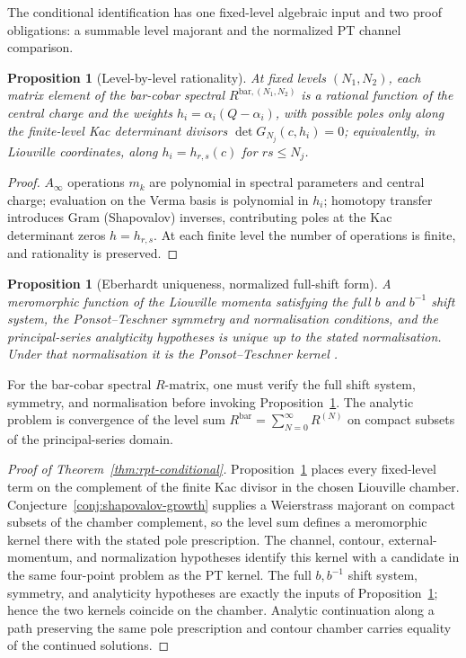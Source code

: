\documentclass[11pt]{amsart}
\newtheorem{proposition}[theorem]{Proposition}
\theoremstyle{definition}
\theoremstyle{remark}
\providecommand{\Ainf}{A_\infty}
\begin{document}
The conditional identification has one fixed-level algebraic input and
two proof obligations: a summable level majorant and the normalized PT
channel comparison.

\begin{proposition}[Level-by-level rationality]
\label{prop:rpt-level-rationality}
At fixed levels $(N_1, N_2)$, each matrix element of the bar-cobar
spectral $R^{\mathrm{bar},(N_1,N_2)}$ is a rational function of
the central charge and the weights
$h_i = \alpha_i(Q - \alpha_i)$, with possible poles only along the
finite-level Kac determinant divisors
$\det G_{N_j}(c,h_i)=0$; equivalently, in Liouville coordinates,
along $h_i=h_{r,s}(c)$ for $rs\leq N_j$.
\end{proposition}

\begin{proof}
$\Ainf$ operations $m_k$ are polynomial in spectral parameters and
central charge; evaluation on the Verma basis is polynomial in $h_i$;
homotopy transfer introduces Gram (Shapovalov) inverses, contributing
poles at the Kac determinant zeros $h = h_{r,s}$. At each finite
level the number of operations is finite, and rationality is
preserved.
\end{proof}

\begin{proposition}[Eberhardt uniqueness, normalized full-shift form]
\label{prop:eberhardt-uniqueness}
A meromorphic function of the Liouville momenta satisfying the full
$b$ and $b^{-1}$ shift system, the Ponsot--Teschner symmetry and
normalisation conditions, and the principal-series analyticity
hypotheses is unique up to the stated normalisation.  Under that
normalisation it is the Ponsot--Teschner kernel
\cite[Theorem~1.1]{Eberhardt23}.
\end{proposition}

For the bar-cobar spectral $R$-matrix, one must verify the full
shift system, symmetry, and normalisation before invoking
Proposition~\ref{prop:eberhardt-uniqueness}.  The analytic problem is
convergence of the level sum
$R^{\mathrm{bar}} = \sum_{N=0}^\infty R^{(N)}$ on compact subsets of
the principal-series domain.

\begin{proof}[Proof of Theorem~\ref{thm:rpt-conditional}]
Proposition~\ref{prop:rpt-level-rationality} places every fixed-level
term on the complement of the finite Kac divisor in the chosen
Liouville chamber.  Conjecture~\ref{conj:shapovalov-growth} supplies
a Weierstrass majorant on compact subsets of the chamber complement,
so the level sum defines a meromorphic kernel there with the stated
pole prescription.  The channel, contour, external-momentum, and
normalization hypotheses identify this kernel with a candidate in the
same four-point problem as the PT kernel.  The full $b,b^{-1}$ shift
system, symmetry, and analyticity hypotheses are exactly the inputs of
Proposition~\ref{prop:eberhardt-uniqueness}; hence the two kernels
coincide on the chamber.  Analytic continuation along a path preserving
the same pole prescription and contour chamber carries equality of the
continued solutions.
\end{proof}
\end{document}
